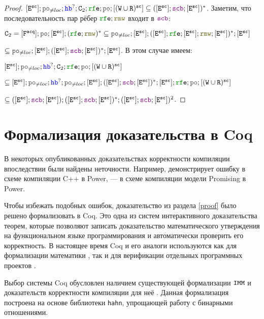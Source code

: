 \begin{proof}
    $[\lE^{\sco}]; \lPO_{\neq loc} ; \lHB^?; \CA_2; \lRFE; \lPO ; [(\lW \cup \lR)^{\sco}]\subseteq  ([\lE^{\sco}] ; \lSCB ; [\lE^{\sco}])^{*}$. Заметим, что последовательность пар рёбер $\lRFE ; \lRMW$ входит в $\lSCB$: 

    $\CA_2=[\Fa] ; \lPO ; [\lE^{\sco}] ; (\lRFE ; \lRMW)^{*} \subseteq \lPO_{\neq loc}; [\lE^{\sco}] ; ([\lE^{\sco}] ; \lRFE; [\lE^{\sco}];  \lRMW; [\lE^{\sco}])^{*}; [\lE^{\sco}]$

    $\subseteq \lPO_{\neq loc}; [\lE^{\sco}] ; ([\lE^{\sco}] ; \lSCB ; [\lE^{\sco}])^{*}; [\lE^{\sco}]$. В этом случае имеем:

    $[\lE^{\sco}]; \lPO_{\neq loc} ; \lHB^?; \CA_2; \lRFE; \lPO ; [(\lW \cup \lR)^{\sco}]$

    $\subseteq [\lE^{\sco}]; \lPO_{\neq loc} ; \lHB^?; \lPO_{\neq loc}; [\lE^{\sco}] ; ([\lE^{\sco}] ; \lSCB ; [\lE^{\sco}])^{*}; [\lE^{\sco}]; \lRFE; \lPO ; [(\lW \cup \lR)^{\sco}]$

    $\subseteq ([\lE^{\sco}] ; \lSCB ; [\lE^{\sco}]) ; ([\lE^{\sco}] ; \lSCB ; [\lE^{\sco}])^{*}; ([\lE^{\sco}] ; \lSCB ; [\lE^{\sco}])^2$. \qedhere  
  
\end{proof}

\section{Формализация доказательства в Coq}

В некоторых опубликованных доказательствах корректности компиляции впоследствии были найдены неточности. Например, \cite{rc11} демонстрирует ошибку в схеме компиляции C++ в Power, \cite{imm} --- в схеме компиляции модели Promising в Power.

Чтобы избежать подобных ошибок, доказательство из раздела \ref{proof} было решено формализовать в Coq. Это одна из систем интерактивного доказательства теорем, которые позволяют записать доказательство математического утверждения на функциональном языке программирования и автоматически проверить его корректность. В настоящее время Coq и его аналоги используются как для формализации математики \cite{four-color}, так и для верификации отдельных программных проектов \cite{compcert}. 

Выбор системы Coq обусловлен наличием существующей формализации $\mathtt{IMM}$ и доказательств корректности компиляции для неё \cite{imm-repo}. Данная формализация построена на основе библиотеки \texttt{hahn}, упрощающей работу с бинарными отношениями.

